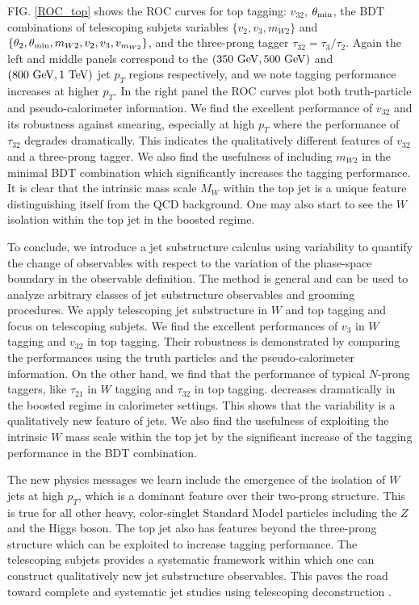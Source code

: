 \documentclass[aps,prl,floatfix,preprintnumbers,twocolumn,groupedaddress,nofootinbib]{revtex4-1}
\begin{document}
FIG. \ref{ROC_top} shows the ROC curves for top tagging: $v_{32}$, $\theta_{\rm min}$, the BDT combinations of telescoping subjets variables $\{v_2, v_3, m_{W2}\}$ and $\{\theta_2,\theta_{\rm min},m_{W2},v_2,v_3,v_{m_{W2}}\}$, and the three-prong tagger $\tau_{32}=\tau_{3}/\tau_{2}$. Again the left and middle panels correspond to the $(350~{\rm GeV}, 500~{\rm GeV})$ and $(800~{\rm GeV}, 1~{\rm TeV})$ jet $p_T$ regions respectively, and we note tagging performance increases at higher $p_T$. In the right panel the ROC curves plot both truth-particle and pseudo-calorimeter information. We find the excellent performance of $v_{32}$ and its robustness against smearing, especially at high $p_T$ where the performance of $\tau_{32}$ degrades dramatically. This indicates the qualitatively different features of $v_{32}$ and a three-prong tagger. We also find the usefulness of including $m_{W2}$ in the minimal BDT combination which significantly increases the tagging performance. It is clear that the intrinsic mass scale $M_W$ within the top jet is a unique feature distinguishing itself from the QCD background. One may also start to see the $W$ isolation within the top jet in the boosted regime.

To conclude, we introduce a %
jet substructure calculus using variability to quantify the change of observables with respect to the variation of the phase-space boundary in the observable definition. The method is general and can be used to analyze arbitrary classes of jet substructure observables and grooming procedures. We apply telescoping jet substructure in $W$ and top tagging and focus on telescoping subjets. We find the excellent performances of $v_3$ in $W$ tagging and $v_{32}$ in top tagging. Their robustness is demonstrated by comparing the performances using the truth particles and the %
pseudo-calorimeter information. On the other hand, we find that the performance of typical $N$-prong taggers, like $\tau_{21}$ in $W$ tagging and $\tau_{32}$ in top tagging. decreases dramatically in the boosted regime in calorimeter settings. This shows that the variability is a qualitatively new feature of jets. We also find the usefulness of exploiting the intrinsic $W$ mass scale within the top jet by the significant increase of the tagging performance in the BDT combination.

The new physics messages we learn include the emergence of the isolation of $W$ jets at high $p_T$, which is a dominant feature over their two-prong structure. This is true for all other heavy, color-singlet Standard Model particles including the $Z$ and the Higgs boson. The top jet also has features beyond the three-prong structure which can be exploited to increase tagging performance. The telescoping subjets provides a systematic framework within which one can construct qualitatively new jet substructure observables. This paves the road toward complete and systematic jet studies using telescoping deconstruction \cite{Chien:2017decon}.
\end{document}
